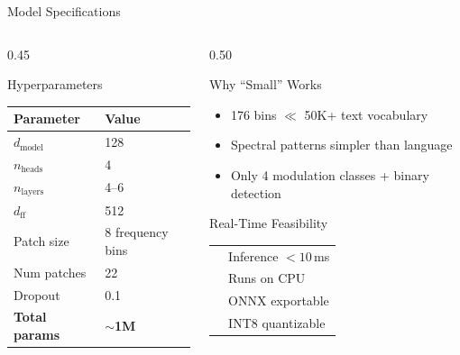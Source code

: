 \documentclass[aspectratio=169, 10pt]{beamer}
\newcommand{\cmark}{\textcolor{teal}{\ding{51}}}
\begin{document}
\begin{frame}{Model Specifications}
\small
\begin{columns}[T]
\begin{column}{0.45\textwidth}
\begin{block}{Hyperparameters}
\footnotesize
\renewcommand{\arraystretch}{1.3}
\begin{tabular}{@{}ll@{}}
\toprule
\textbf{Parameter} & \textbf{Value} \\
\midrule
$d_\text{model}$     & 128 \\
$n_\text{heads}$     & 4 \\
$n_\text{layers}$    & 4--6 \\
$d_\text{ff}$        & 512 \\
Patch size            & 8 frequency bins \\
Num patches           & 22 \\
Dropout               & 0.1 \\
\textbf{Total params} & \textbf{$\sim$1M} \\
\bottomrule
\end{tabular}
\end{block}
\end{column}

\begin{column}{0.50\textwidth}
\begin{block}{Why ``Small'' Works}
\footnotesize
\begin{itemize}
  \item 176 bins $\ll$ 50K+ text vocabulary
  \item Spectral patterns simpler than language
  \item Only 4 modulation classes + binary detection
\end{itemize}
\end{block}

\vspace{2pt}

\begin{exampleblock}{Real-Time Feasibility}
\footnotesize
\begin{tabular}{@{}cl@{}}
  \cmark & Inference $< 10$\,ms \\
  \cmark & Runs on CPU \\
  \cmark & ONNX exportable \\
  \cmark & INT8 quantizable \\
\end{tabular}
\end{exampleblock}
\end{column}
\end{columns}
\end{frame}
\end{document}
